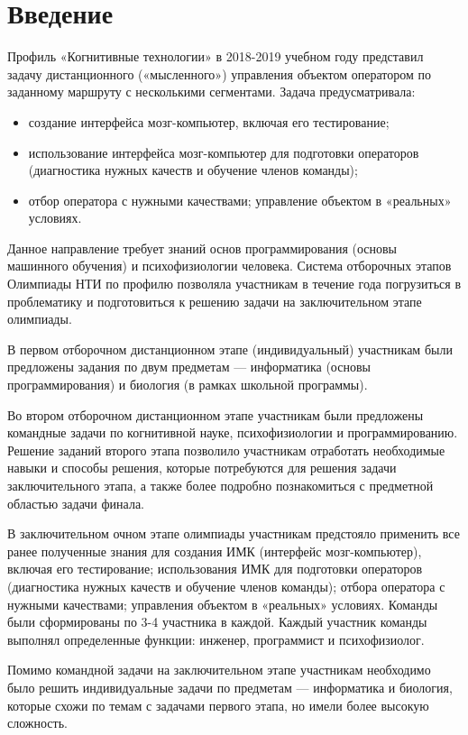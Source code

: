 
%

\begingroup
\pagestyle{empty}

\section*{Введение}

Профиль «Когнитивные технологии» в 2018-2019 учебном году представил задачу дистанционного («мысленного») управления объектом оператором по заданному маршруту с несколькими сегментами. Задача предусматривала: 
\begin{itemize}
\item создание интерфейса мозг-компьютер, включая его тестирование; 
\item использование интерфейса мозг-компьютер для подготовки операторов (диагностика нужных качеств и обучение членов команды); 
\item отбор оператора с нужными качествами; управление объектом в «реальных» условиях. 
\end{itemize}

Данное направление требует знаний основ программирования  (основы машинного обучения) и психофизиологии человека. Система отборочных этапов Олимпиады НТИ по профилю позволяла участникам в течение года погрузиться в проблематику и подготовиться к решению задачи на заключительном этапе олимпиады.

В первом отборочном дистанционном этапе (индивидуальный) участникам были предложены задания по двум предметам — информатика (основы программирования) и биология (в рамках школьной программы).

Во втором отборочном дистанционном этапе участникам были предложены командные задачи по когнитивной науке, психофизиологии и программированию. Решение заданий второго этапа позволило участникам отработать необходимые навыки и способы решения, которые потребуются для решения задачи заключительного этапа, а также более подробно познакомиться с предметной областью задачи финала.

В заключительном очном этапе олимпиады участникам предстояло применить все ранее полученные знания для создания ИМК (интерфейс мозг-компьютер), включая его тестирование;  	использования ИМК для подготовки операторов (диагностика нужных качеств и обучение членов команды);  	отбора оператора с нужными качествами;    управления объектом в «реальных» условиях. Команды были сформированы по 3-4 участника в каждой. Каждый участник команды выполнял  определенные функции: инженер, программист и психофизиолог. 

Помимо командной задачи на заключительном этапе участникам необходимо было решить индивидуальные задачи по предметам — информатика и биология, которые схожи по темам с задачами первого этапа, но имели более высокую сложность.

\clearpage
\endgroup